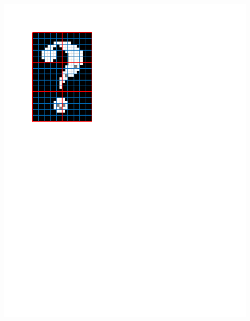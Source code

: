 \documentclass{beamer}
\begin{document}
\begin{frame}
\begin{columns}
\begin{column}{0.45\textwidth}
\end{column}
\end{columns}
\begin{columns}
\begin{column}{0.5\textwidth}
\begin{center}
\includegraphics[width=1\textwidth,trim={0 6.5in 4in 1in},clip]{replace_defect_1}
\end{center}
\end{column}
\begin{column}{0.5\textwidth}
\begin{center}

\end{center}
\end{column}
\end{columns}
\end{frame}
\end{document}
